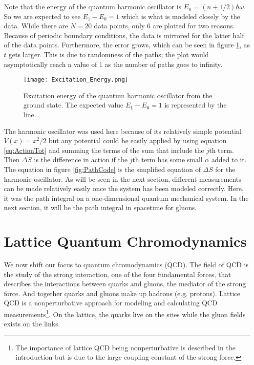 \documentclass[11pt]{article}
\begin{document}
Note that the energy of the quantum harmonic oscillator is $E_n=(n+1/2)\hbar\omega$. So we are expected to see $E_1-E_0=1$ which is what is modeled closely by the data. While there are $N=20$ data points, only 6 are plotted for two reasons. Because of periodic boundary conditions, the data is mirrored for the latter half of the data points. Furthermore, the error grows, which can be seen in figure \ref{fig:ExciteE}, as $t$ gets larger. This is due to randomness of the paths; the plot would asymptotically reach a value of 1 as the number of paths goes to infinity.

\begin{figure}[h]
	\centering
	\texttt{[image: Excitation\_Energy.png]}
	\caption{Excitation energy of the quantum harmonic oscillator from the ground state. The expected value $E_1-E_0=1$ is represented by the line.}
	\label{fig:ExciteE}
\end{figure}

The harmonic oscillator was used here because of its relatively simple potential $V(x)=x^2/2$ but any potential could be easily applied by using equation \ref{eq:ActionTot} and summing the terms of the sum that include the $j$th term. Then $\Delta S$ is the difference in action if the $j$th term has some small $\alpha$ added to it. The equation in figure \ref{fig:PathCode} is the simplified equation of $\Delta S$ for the harmonic oscillator. As will be seen in the next section, different measurements can be made relatively easily once the system has been modeled correctly. Here, it was the path integral on a one-dimensional quantum mechanical system. In the next section, it will be the path integral in spacetime for gluons.

\section{Lattice Quantum Chromodynamics}
We now shift our focus to quantum chromodynamics (QCD). The field of QCD is the study of the strong interaction, one of the four fundamental forces, that describes the interactions between quarks and gluons, the mediator of the strong force. And together quarks and gluons make up hadrons (e.g. protons). Lattice QCD is a nonperturbative approach for modeling and calculating QCD measurements\footnote{The importance of lattice QCD being nonperturbative is described in the introduction but is due to the large coupling constant of the strong force.}. On the lattice, the quarks live on the sites while the gluon fields exists on the links.
\end{document}
